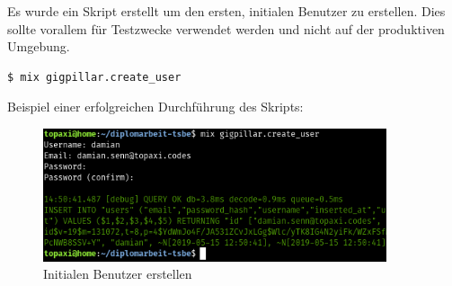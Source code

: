Es wurde ein Skript erstellt um den ersten, initialen Benutzer zu erstellen.
Dies sollte vorallem für Testzwecke verwendet werden und nicht auf der
produktiven Umgebung.

\begin{lstlisting}[language=bash,frame=single]
$ mix gigpillar.create_user
\end{lstlisting}

\noindent{}Beispiel einer erfolgreichen Durchführung des Skripts:

\begin{figure}[!htb]
  \centering
  \includegraphics[width=0.9\textwidth]{einfuehrung/create-user.png}
  \caption{Initialen Benutzer erstellen}
\end{figure}
